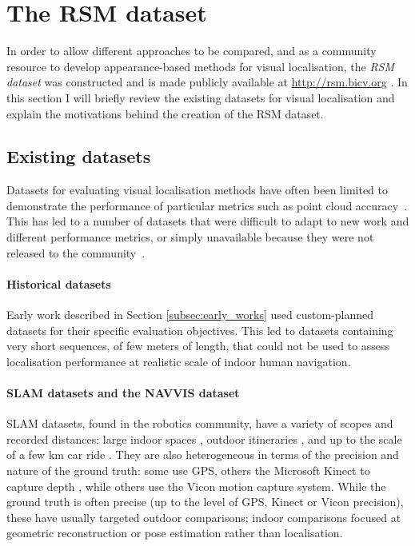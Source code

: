 \section{The RSM dataset}
\label{sec:Dataset}
In order to allow different approaches to be compared, and as a community resource to develop appearance-based methods for visual localisation, the \textit{RSM dataset} was constructed and is made publicly available at \url{http://rsm.bicv.org} \cite{Rivera-Rubio2014}. In this section I will briefly review the existing datasets for visual localisation and explain the motivations behind the creation of the RSM dataset.


\subsection{Existing datasets}

Datasets for evaluating visual localisation methods have often been limited to demonstrate the performance of particular metrics such as point cloud accuracy~\cite{Huitl2012, nardi2014introducing}. This has led to a number of datasets that were difficult to adapt to new work and different performance metrics, or simply unavailable because they were not released to the community~\cite{Matsumoto1996,Ohno1996,Tang2001}.

\paragraph{Historical datasets}

Early work described in Section \ref{subsec:early_works} used custom-planned datasets for their specific evaluation objectives. This led to datasets \cite{Matsumoto1996,Ohno1996,Tang2001} containing very short sequences, of few meters of length, that could not be used to assess localisation performance at realistic scale of indoor human navigation.

\paragraph{SLAM datasets and the NAVVIS dataset}

SLAM  da\-ta\-sets, found in the robotics community, have a variety of scopes and recorded distances: large indoor spaces \cite{sturm12iros}, outdoor i\-ti\-ne\-ra\-ries \cite{Bosse2004}, and up to the scale of a few km car ride \cite{Simpson2011}. They are also heterogeneous in terms of the precision and nature of the ground truth: some use GPS, others the Microsoft Kinect to capture depth \cite{sturm12iros}, while others use the Vicon motion capture system. While the ground truth is often precise (up to the level of GPS, Kinect or Vicon precision), these have usually targeted outdoor comparisons; indoor comparisons focused at geometric reconstruction or pose estimation rather than localisation.

